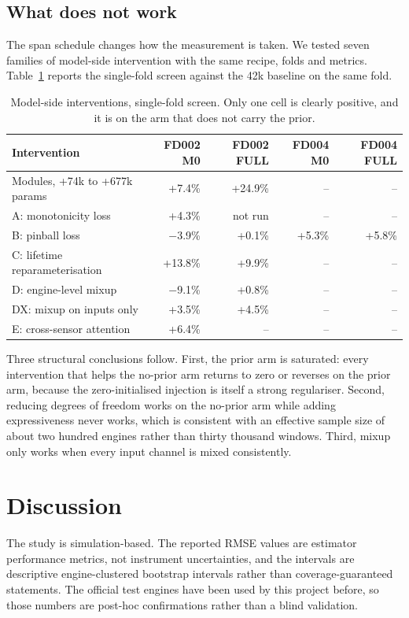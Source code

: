 \documentclass[journal]{IEEEtran}
\begin{document}
\subsection{What does not work}\label{sec:negative}
The span schedule changes how the measurement is taken. We tested seven families of model-side intervention with the same recipe, folds and metrics. Table~\ref{tab:neg} reports the single-fold screen against the 42k baseline on the same fold.

\begin{table}[t]
\centering
\caption{Model-side interventions, single-fold screen. Only one cell is clearly positive, and it is on the arm that does not carry the prior.}
\label{tab:neg}
\footnotesize
\setlength{\tabcolsep}{3pt}
\begin{tabular}{lrrrr}
\toprule
Intervention & FD002 M0 & FD002 FULL & FD004 M0 & FD004 FULL \\
\midrule
Modules, +74k to +677k params & +7.4\% & +24.9\% & -- & -- \\
A: monotonicity loss & +4.3\% & not run & -- & -- \\
B: pinball loss & $-$3.9\% & +0.1\% & +5.3\% & +5.8\% \\
C: lifetime reparameterisation & +13.8\% & +9.9\% & -- & -- \\
D: engine-level mixup & $-$9.1\% & +0.8\% & -- & -- \\
DX: mixup on inputs only & +3.5\% & +4.5\% & -- & -- \\
E: cross-sensor attention & +6.4\% & -- & -- & -- \\
\bottomrule
\end{tabular}
\end{table}

Three structural conclusions follow. First, the prior arm is saturated: every intervention that helps the no-prior arm returns to zero or reverses on the prior arm, because the zero-initialised injection is itself a strong regulariser. Second, reducing degrees of freedom works on the no-prior arm while adding expressiveness never works, which is consistent with an effective sample size of about two hundred engines rather than thirty thousand windows. Third, mixup only works when every input channel is mixed consistently.

\section{Discussion}\label{sec:disc}

The study is simulation-based. The reported RMSE values are estimator performance metrics, not instrument uncertainties, and the intervals are descriptive engine-clustered bootstrap intervals rather than coverage-guaranteed statements. The official test engines have been used by this project before, so those numbers are post-hoc confirmations rather than a blind validation.
\end{document}
